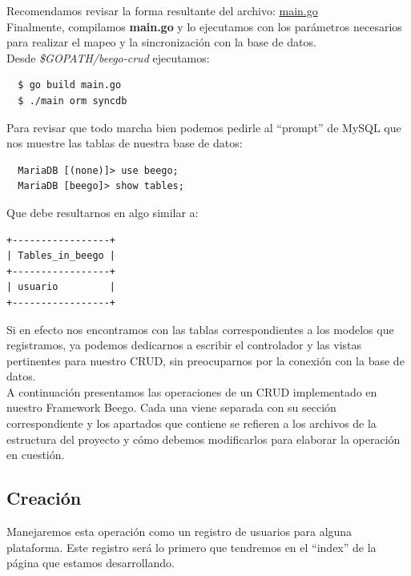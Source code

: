 \documentclass[12pt]{article}
\begin{document}
\noindent
Recomendamos revisar la forma resultante del archivo: \href{https://github.com/Kihui/Beego-CRUD/blob/master/main.go}{main.go} \\

Finalmente, compilamos \textbf{main.go} y lo ejecutamos con los parámetros necesarios
para realizar el mapeo y la sincronización con la base de datos.\\

\noindent
Desde \textit{\$GOPATH/beego-crud} ejecutamos:
\begin{verbatim}
  $ go build main.go
  $ ./main orm syncdb
\end{verbatim}

\noindent
Para revisar que todo marcha bien podemos pedirle al ``prompt'' de MySQL que nos
muestre las tablas de nuestra base de datos:
\begin{verbatim}
  MariaDB [(none)]> use beego;
  MariaDB [beego]> show tables;
\end{verbatim}

\noindent
Que debe resultarnos en algo similar a:
\begin{verbatim}
+-----------------+
| Tables_in_beego |
+-----------------+
| usuario         |
+-----------------+
\end{verbatim}

Si en efecto nos encontramos con las tablas correspondientes a los modelos que
registramos, ya podemos dedicarnos a escribir el controlador y las vistas
pertinentes para nuestro CRUD, sin preocuparnos por la conexión con la base
de datos.\\

A continuación presentamos las operaciones de un CRUD implementado en nuestro
Framework Beego. Cada una viene separada con su sección correspondiente y los
apartados que contiene se refieren a los archivos de la estructura del proyecto
y cómo debemos modificarlos para elaborar la operación en cuestión.\\

\subsection{Creación}
Manejaremos esta operación como un registro de usuarios para alguna plataforma.
Este registro será lo primero que tendremos en el ``index'' de la página que
estamos desarrollando.
\end{document}
